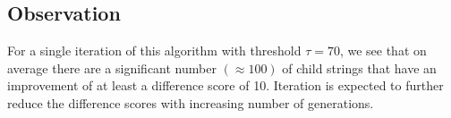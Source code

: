 \documentclass[]{article}
\begin{document}
		\subsection{Observation}
			For a single iteration of this algorithm with threshold $\tau = 70$, we see that on average there are a significant number $(\approx 100)$ of child strings that have an improvement of at least a difference score of 10. Iteration is expected to further reduce the difference scores with increasing number of generations.
\end{document}
